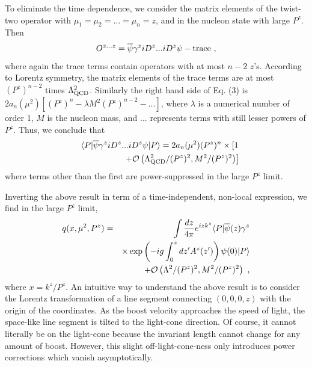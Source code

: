 \documentclass[aps,prd,preprint,tightenlines,superscriptaddress]{revtex4}
\begin{document}
To eliminate the time dependence, we consider the matrix elements of the twist-two operator with $\mu_1=\mu_2=...=\mu_n=z$,
and in the nucleon state with large $P^z$.  Then
\begin{equation}
   O^{z...z} = {\overline \psi}\gamma^{z}iD^{z} ... iD^{z} \psi - {\rm trace} \ ,
\end{equation}
where again the trace terms contain operators with at most $n-2$ $z$'s. According
to Lorentz symmetry, the matrix elements of the trace terms are at most
$(P^z)^{n-2}$ times $\Lambda^2_{\rm QCD}$. Similarly the right hand side of Eq. (3) is
$2a_n(\mu^2)\left[(P^z)^n-\lambda M^2(P^z)^{n-2}-...\right]$, where $\lambda$ is a numerical number of
order 1, $M$ is the nucleon mass, and ... represents terms
with still lesser powers of $P^z$. Thus, we conclude that
\begin{eqnarray}
     && \langle P| {\overline \psi}\gamma^{z}iD^{z} ... iD^{z} \psi|P\rangle
       = 2a_n(\mu^2) (P^z)^n\times \left[ 1 \right.\\ && \left.+ {\cal O}\left(\Lambda^2_{\rm QCD}/(P^z)^2,  M^2/(P^z)^2\right)\right] \nonumber
\end{eqnarray}
where terms other than the first are power-suppressed in the large $P^z$ limit.

Inverting the above result in term of a time-independent, non-local expression, we find
in the large $P^z$ limit,
\begin{eqnarray}
   q(x,\mu^2, P^z) &=& \int \frac{dz}{4\pi} e^{izk^z}  \langle P|\overline{\psi}(z)
   \gamma^z \\
   && \times \exp\left(-ig\int^{z}_0 dz' A^z(z') \right)\psi(0) |P\rangle \nonumber
 \\ && + {\cal O}\left(\Lambda^2/(P^z)^2,  M^2/(P^z)^2\right) \ ,  \nonumber
\end{eqnarray}
where $x= k^z/P^z$.
An intuitive way to understand the above result is to consider
the Lorentz transformation of a line segment connecting $(0,0,0,z)$ with the origin of the coordinates.
As the boost velocity approaches the speed of light, the space-like line segment is tilted to the
light-cone direction. Of course, it cannot literally be on the light-cone because the invariant length
cannot change for any amount of boost. However, this slight off-light-cone-ness only introduces power corrections
which vanish asymptotically.
\end{document}
